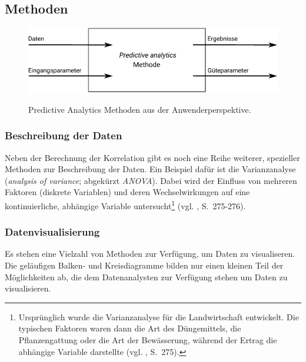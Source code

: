 
\subsection{Methoden}

\begin{figure}%
\centering
\caption{Predictive Analytics Methoden aus der Anwenderperspektive.}
\includegraphics[scale=1.0]{Grafiken/PA_Methoden_Ink.pdf} 
\label{pic:PA_Methoden}
\end{figure}

% 
\subsubsection{Beschreibung der Daten}

Neben der Berechnung der Korrelation gibt es noch eine Reihe weiterer, spezieller
Methoden zur Beschreibung der Daten. Ein Beispiel dafür ist die Varianzanalyse
(\emph{analysis of variance}; abgekürzt \emph{ANOVA}). Dabei wird der Einfluss
von mehreren Faktoren (diskrete Variablen) und deren Wechselwirkungen auf eine
kontinuierliche, abhängige Variable untersucht\footnote{
Ursprünglich wurde die Varianzanalyse für die Landwirtschaft entwickelt. Die
typischen Faktoren waren dann die Art des Düngemittels, die Pflanzengattung oder
die Art der Bewässerung, während der Ertrag die abhängige Variable darstellte
(vgl. \cite{Bijma}, S.~275).
} (vgl. \cite{Bijma}, S.~275-276).


\subsubsection{Datenvisualisierung}

Es stehen eine Vielzahl von Methoden zur Verfügung, um Daten zu visualiseren.
Die geläufigen Balken- und Kreisdiagramme bilden nur einen kleinen Teil der
Möglichkeiten ab, die dem Datenanalysten zur Verfügung stehen um Daten zu
visualisieren.


